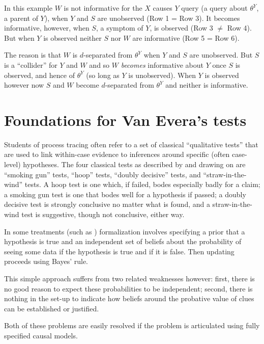 \documentclass[
  12pt,
]{book}
\begin{document}
In this example \(W\) is not informative for the \(X\) causes \(Y\) query (a query about \(\theta^Y\), a parent of \(Y\)), when \(Y\) and \(S\) are unobserved (Row 1 = Row 3). It becomes informative, however, when \(S\), a symptom of \(Y\), is observed (Row 3 \(\neq\) Row 4). But when \(Y\) is observed neither \(S\) nor \(W\) are informative (Row 5 = Row 6).

The reason is that \(W\) is \(d\)-separated from \(\theta^Y\) when \(Y\) and \(S\) are unobserved. But \(S\) is a ``collider'' for \(Y\) and \(W\) and so \(W\) \emph{becomes} informative about \(Y\) once \(S\) is observed, and hence of \(\theta^Y\) (so long as \(Y\) is unobserved). When \(Y\) is observed however now \(S\) and \(W\) become \(d\)-separated from \(\theta^Y\) and neither is informative.

\hypertarget{foundations-for-van-everas-tests}{%
\section{Foundations for Van Evera's tests}\label{foundations-for-van-everas-tests}}

Students of process tracing often refer to a set of classical ``qualitative tests'' that are used to link within-case evidence to inferences around specific (often case-level) hypotheses. The four classical tests as described by \citet{collier2011understanding} and drawing on \citet{Van-Evera:1997} are ``smoking gun'' tests, ``hoop'' tests, ``doubly decisive'' tests, and ``straw-in-the-wind'' tests. A hoop test is one which, if failed, bodes especially badly for a claim; a smoking gun test is one that bodes well for a hypothesis if passed; a doubly decisive test is strongly conclusive no matter what is found, and a straw-in-the-wind test is suggestive, though not conclusive, either way.

In some treatments (such as \citet{humphreys2015mixing}) formalization involves specifying a prior that a hypothesis is true and an independent set of beliefs about the probability of seeing some data if the hypothesis is true and if it is false. Then updating proceeds using Bayes' rule.

This simple approach suffers from two related weaknesses however: first, there is no good reason to expect these probabilities to be independent; second, there is nothing in the set-up to indicate how beliefs around the probative value of clues can be established or justified.

Both of these problems are easily resolved if the problem is articulated using fully specified causal models.
\end{document}

